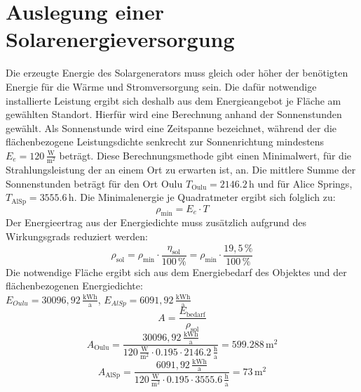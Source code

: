 \section{Auslegung einer Solarenergieversorgung}
  Die erzeugte Energie des Solargenerators muss gleich oder höher der benötigten Energie für die Wärme und Stromversorgung sein.
  Die dafür notwendige installierte Leistung ergibt sich deshalb aus dem Energieangebot je Fläche am gewählten Standort.
  Hierfür wird eine Berechnung anhand der Sonnenstunden gewählt.
  Als Sonnenstunde wird eine Zeitspanne bezeichnet, während der die flächenbezogene Leistungsdichte senkrecht zur Sonnenrichtung mindestens \(E_e = \mathrm{120\,\frac{W}{m^2}}\) beträgt.
  Diese Berechnungsmethode gibt einen Minimalwert, für die Strahlungsleistung der an einem Ort zu erwarten ist, an.
  Die mittlere Summe der Sonnenstunden beträgt für den Ort Oulu \(T_\mathrm{Oulu} = \mathrm{2146.2\,h}\) und für Alice Springs, \(T_\mathrm{AlSp} = \mathrm{3555.6\,h}\).
  Die Minimalenergie je Quadratmeter ergibt sich folglich zu:
  \[\rho_\mathrm{\min} = E_e \cdot T\]
  Der Energieertrag aus der Energiedichte muss zusätzlich aufgrund des Wirkungsgrads reduziert werden:
  \[\rho_\mathrm{sol} = \rho_\mathrm{\min} \cdot \frac{\eta_\mathrm{sol}}{100\,\%}= \rho_\mathrm{\min} \cdot \frac{19,5\,\%}{100\,\%}\] 
  Die notwendige Fläche ergibt sich aus dem Energiebedarf des Objektes und der flächenbezogenen Energiedichte:\\
  \(E_{Oulu} = \mathrm{30096,92\,\frac{kWh}{a}}\), \(E_{AlSp} = \mathrm{6091,92\,\frac{kWh}{a}}\)\\
  \[A = \frac{E_\mathrm{bedarf}}{\rho_\mathrm{sol}}\]
  \[A_\mathrm{Oulu} = \mathrm{\frac{30096,92\,\frac{kWh}{a}}{\mathrm{120\,\frac{W}{m^2}} \cdot 0.195 \cdot 2146.2\,\frac{h}{a}} = 599.288\,m^2}\]
  \[A_\mathrm{AlSp} = \mathrm{\frac{6091,92\,\frac{kWh}{a}}{\mathrm{120\,\frac{W}{m^2}} \cdot 0.195 \cdot 3555.6\,\frac{h}{a}} = 73\,m^2}\]

